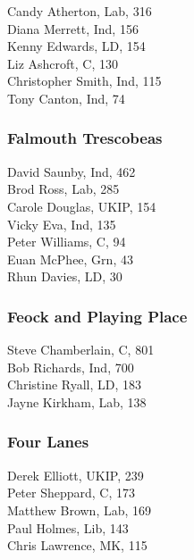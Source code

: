 \documentclass[a4paper,openany,10pt]{book}
\begin{document}


Candy Atherton, Lab, 316\\
Diana Merrett, Ind, 156\\
Kenny Edwards, LD, 154\\
Liz Ashcroft, C, 130\\
Christopher Smith, Ind, 115\\
Tony Canton, Ind, 74\\


\subsubsection*{Falmouth Trescobeas}



David Saunby, Ind, 462\\
Brod Ross, Lab, 285\\
Carole Douglas, UKIP, 154\\
Vicky Eva, Ind, 135\\
Peter Williams, C, 94\\
Euan McPhee, Grn, 43\\
Rhun Davies, LD, 30\\


\subsubsection*{Feock and Playing Place}



Steve Chamberlain, C, 801\\
Bob Richards, Ind, 700\\
Christine Ryall, LD, 183\\
Jayne Kirkham, Lab, 138\\


\subsubsection*{Four Lanes}



Derek Elliott, UKIP, 239\\
Peter Sheppard, C, 173\\
Matthew Brown, Lab, 169\\
Paul Holmes, Lib, 143\\
Chris Lawrence, MK, 115\\
\end{document}
